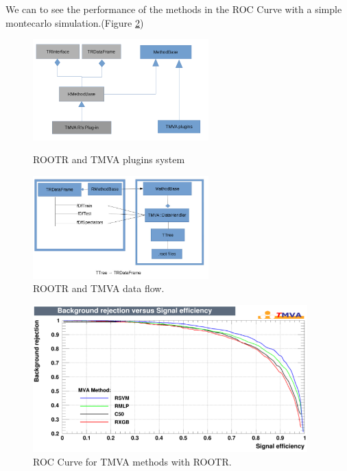 \documentclass[a4paper]{jpconf}
\begin{document}
We can to see the performance of the methods in the ROC Curve with a simple montecarlo simulation.(Figure \ref{rmvaroc})

\begin{figure}[h]
\centering
\begin{minipage}{15pc}
\includegraphics[width=16pc]{img/rmvaplugins.png}
\caption{\label{rmvaplug}ROOTR and TMVA plugins system}
\end{minipage}
\begin{minipage}{15pc}
\includegraphics[width=16pc]{img/rmvadf.jpg}
\caption{\label{rmvadf}ROOTR and TMVA data flow.}
\end{minipage}\hspace{2pc}%
\end{figure}

\begin{figure}[h]
\centering
\includegraphics[width=25pc]{img/rmvaroc.png}\caption{\label{rmvaroc} ROC Curve for TMVA methods with ROOTR.}
\end{figure}
\end{document}
